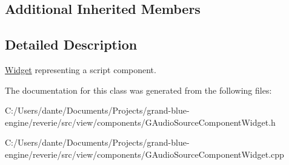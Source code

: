 \subsection*{Additional Inherited Members}


\subsection{Detailed Description}
\mbox{\hyperlink{class_widget}{Widget}} representing a script component. 

The documentation for this class was generated from the following files\+:\begin{DoxyCompactItemize}
\item 
C\+:/\+Users/dante/\+Documents/\+Projects/grand-\/blue-\/engine/reverie/src/view/components/G\+Audio\+Source\+Component\+Widget.\+h\item 
C\+:/\+Users/dante/\+Documents/\+Projects/grand-\/blue-\/engine/reverie/src/view/components/G\+Audio\+Source\+Component\+Widget.\+cpp\end{DoxyCompactItemize}
